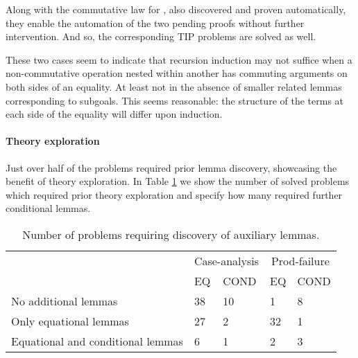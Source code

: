 \noindent Along with the commutative law for , also discovered and proven automatically, they enable the automation of the two pending proofs without further intervention.
%
And so, the corresponding TIP problems are solved as well.

These two cases seem to indicate that recursion induction may not suffice when a non-commutative operation nested within another has commuting arguments on both sides of an equality.
%
At least not in the absence of smaller related lemmas corresponding to subgoals.
%
This seems reasonable: the structure of the terms at each side of the equality will differ upon induction.

%


\paragraph{Theory exploration}

Just over half of the problems required prior lemma discovery, showcasing the benefit of theory exploration. In Table \ref{tab:explore} we show the number of solved problems which required prior theory exploration and specify how many required further conditional lemmas.

\begin{table}
\begin{tabularx}{\textwidth}{l | X X | X X}
  & \multicolumn{2}{c|}{Case-analysis} & \multicolumn{2}{c}{Prod-failure} \\
  &  EQ & COND & EQ & COND \\
  \hline
  No additional lemmas & 38 & 10 & 1 & 8 \\
  Only equational lemmas & 27 & 2 & 32 & 1 \\
  Equational and conditional lemmas & 6 & 1 & 2 & 3 \\
\end{tabularx}
\caption{Number of problems requiring discovery of auxiliary lemmas.}
\label{tab:explore}
\end{table}

%
%

